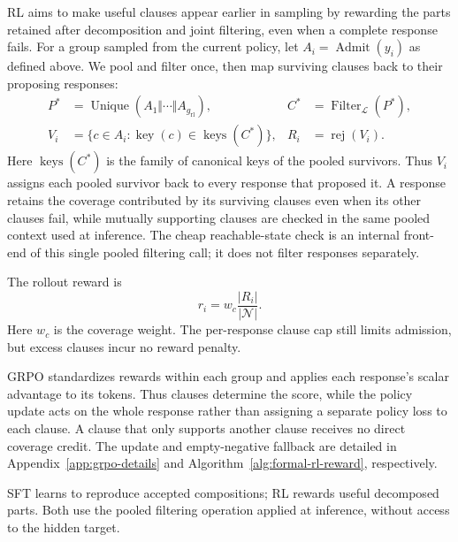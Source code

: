 RL aims to make useful clauses appear earlier in sampling by rewarding the
parts retained after decomposition and joint filtering, even when a complete
response fails.  For a group sampled from the current policy, let
\(A_i=\operatorname{Admit}(y_i)\) as defined above.  We pool and filter once,
then map surviving clauses back to their proposing responses:
\begin{align}
  P^*&=\operatorname{Unique}\!\left(A_1\Vert\cdots\Vert A_{g_{\mathrm{rl}}}\right),
  &C^*&=\operatorname{Filter}_{\mathcal L}(P^*),\\
  V_i&=\{c\in A_i:\operatorname{key}(c)\in\operatorname{keys}(C^*)\},
  &R_i&=\operatorname{rej}(V_i).
  \label{eq:method-credit-pool}
\end{align}
Here \(\operatorname{keys}(C^*)\) is the family of canonical keys of the
pooled survivors.  Thus \(V_i\) assigns each pooled survivor back to every response that proposed
it.  A response retains the coverage contributed by its surviving clauses
even when its other clauses fail, while mutually supporting clauses are
checked in the same pooled context
used at inference.  The cheap reachable-state check is an internal front-end
of this single pooled filtering call; it does not filter responses separately.

The rollout reward is
\begin{equation}
\label{eq:generation-reward}
  r_i=w_c\frac{|R_i|}{|\mathcal N|}.
\end{equation}
Here \(w_c\) is the coverage weight.  The per-response clause cap still
limits admission, but excess clauses incur no reward penalty.

GRPO standardizes rewards within each group and applies each response's
scalar advantage to its tokens.  Thus clauses determine the score, while the
policy update acts on the whole response rather than assigning a separate
policy loss to each clause.  A clause that only supports another clause
receives no direct coverage credit.  The update and empty-negative fallback are detailed
in Appendix~\ref{app:grpo-details} and
Algorithm~\ref{alg:formal-rl-reward}, respectively.

SFT learns to reproduce accepted compositions; RL rewards useful decomposed
parts.  Both use the pooled filtering operation applied at inference, without
access to the hidden target.
